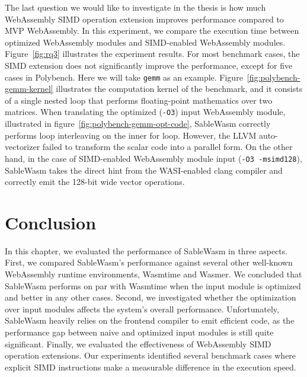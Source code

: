 The last question we would like to investigate in the thesis is how much WebAssembly SIMD operation extension improves performance compared to MVP WebAssembly. In this experiment, we compare the execution time between optimized WebAssembly modules and SIMD-enabled WebAssembly modules. Figure~\ref{fig:rq3} illustrates the experiment results. For most benchmark cases, the SIMD extension does not significantly improve the performance, except for five cases in Polybench. Here we will take \texttt{gemm} as an example. Figure~\ref{fig:polybench-gemm-kernel} illustrates the computation kernel of the benchmark, and it consists of a single nested loop that performs floating-point mathematics over two matrices. When translating the optimized (\texttt{-O3}) input WebAssembly module, illustrated in figure~\ref{fig:polybench-gemm-opt-code}, SableWasm correctly performs loop interleaving on the inner for loop. However, the LLVM auto-vectorizer failed to transform the scalar code into a parallel form. On the other hand, in the case of SIMD-enabled WebAssembly module input (\texttt{-O3 -msimd128}), SableWasm takes the direct hint from the WASI-enabled clang compiler and correctly emit the 128-bit wide vector operations.

\section*{Conclusion}

In this chapter, we evaluated the performance of SableWasm in three aspects. First, we compared SableWasm's performance against several other well-known WebAssembly runtime environments, Wasmtime and Wasmer. We concluded that SableWasm performs on par with Wasmtime when the input module is optimized and better in any other cases. Second, we investigated whether the optimization over input modules affects the system's overall performance. Unfortunately, SableWasm heavily relies on the frontend compiler to emit efficient code, as the performance gap between naive and optimized input modules is still quite significant. Finally, we evaluated the effectiveness of WebAssembly SIMD operation extensions. Our experiments identified several benchmark cases where explicit SIMD instructions make a measurable difference in the execution speed.